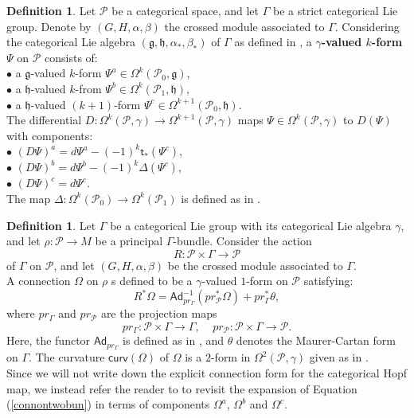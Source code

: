 \documentclass{article}
\theoremstyle{plain}
\theoremstyle{definition}
\newtheorem{defn}[thm]{Definition}
\begin{document}
\begin{defn}\cite[Definition 4.1.1 on page 15]{MR3894086}
Let $\mathcal{P}$ be a categorical space, and let $\Gamma$ be a strict categorical Lie group. Denote by $(G,H,\alpha,\beta)$ the crossed module associated to $\Gamma$. Considering the categorical Lie algebra $(\mathfrak{g},\mathfrak{h},\alpha_\ast,\beta_\ast)$ of $\Gamma$ as defined in \cite[Section 2.1 on page 3]{MR3894086}, a \textbf{$\gamma$-valued $k$-form} $\Psi$ on $\mathcal{P}$ consists of: \\
$\bullet$ a $\mathfrak{g}$-valued $k$-form $\Psi^a \in \Omega^k(\mathcal{P}_0,\mathfrak{g})$, \\
$\bullet$ a $\mathfrak{h}$-valued $k$-from $\Psi^b \in \Omega^k(\mathcal{P}_1,\mathfrak{h})$, \\
$\bullet$ a $\mathfrak{h}$-valued $(k+1)$-form $\Psi^c \in \Omega^{k+1}(\mathcal{P}_0,\mathfrak{h})$. \\
The differential $D:\Omega^k(\mathcal{P},\gamma) \longrightarrow \Omega^{k+1}(\mathcal{P},\gamma)$ maps $\Psi \in \Omega^k(\mathcal{P},\gamma)$ to $D(\Psi)$ with components: \\
$\bullet$ $(D\Psi)^a = d\Psi^a - (-1)^k \mathsf{t}_\ast(\Psi^c)$, \\
$\bullet$ $(D\Psi)^b = d\Psi^b - (-1)^k \Delta(\Psi^c)$, \\
$\bullet$ $(D\Psi)^c = d\Psi^c$. \\
The map $\Delta:\Omega^k(\mathcal{P}_0) \longrightarrow \Omega^k(\mathcal{P}_1)$ is defined as in \cite[Section 4.1 on page 14]{MR3894086}.
\end{defn}
\begin{defn}\cite[Definition 5.1.1 on page 18]{MR3894086}\label{connectiononcatbundle}
Let $\Gamma$ be a categorical Lie group with its categorical Lie algebra $\gamma$, and let $\rho:\mathcal{P} \longrightarrow M$ be a principal $\Gamma$-bundle. Consider the action $$R:\mathcal{P} \times \Gamma \longrightarrow \mathcal{P}$$ of $\Gamma$ on $\mathcal{P}$, and let $(G,H,\alpha,\beta)$ be the crossed module associated to $\Gamma$. \\
A connection $\Omega$ on $\rho$ s defined to be a $\gamma$-valued $1$-form on $\mathcal{P}$ satisfying:
\begin{equation}\label{connontwobun}
R^\ast \Omega = \mathsf{Ad}^{-1}_{pr_\Gamma}(pr^\ast_\mathcal{P} \Omega) + pr^\ast_\Gamma \theta,
\end{equation}
where $pr_\Gamma$ and $pr_\mathcal{P}$ are the projection maps
\[
pr_\Gamma:\mathcal{P} \times \Gamma \longrightarrow \Gamma, ~~~~~
pr_\mathcal{P}:\mathcal{P} \times \Gamma \longrightarrow \mathcal{P}.
\]
Here, the functor $\mathsf{Ad}_{pr_\Gamma}$ is defined as in \cite[Section 4.2 on page 16]{MR3894086}, and $\theta$ denotes the Maurer-Cartan form on $\Gamma$. The curvature $\mathsf{curv}(\Omega)$ of $\Omega$ is a $2$-form in $\Omega^2(\mathcal{P},\gamma)$ given as in \cite[Definition 5.1.3 on page 19]{MR3894086}. \\
Since we will not write down the explicit connection form for the categorical Hopf map, we instead refer the reader to \cite[Section 5.1 on page 19]{MR3894086} to revisit the expansion of Equation (\ref{connontwobun}) in terms of components $\Omega^a$, $\Omega^b$ and $\Omega^c$.
\end{defn}
\end{document}
